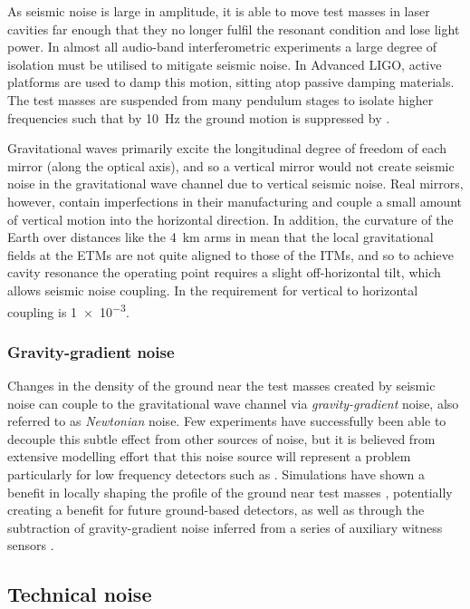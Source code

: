 As seismic noise is large in amplitude, it is able to move test masses in laser cavities far enough that they no longer fulfil the resonant condition and lose light power. In almost all audio-band interferometric experiments a large degree of isolation must be utilised to mitigate seismic noise. In Advanced \gls{LIGO}, active platforms are used to damp this motion, sitting atop passive damping materials. The test masses are suspended from many pendulum stages to isolate higher frequencies such that by \SI{10}{\hertz} the ground motion is suppressed by .

Gravitational waves primarily excite the longitudinal degree of freedom of each mirror (along the optical axis), and so a vertical mirror would not create seismic noise in the gravitational wave channel due to vertical seismic noise. Real mirrors, however, contain imperfections in their manufacturing and couple a small amount of vertical motion into the horizontal direction. In addition, the curvature of the Earth over distances like the \SI{4}{\kilo\meter} arms in \ALIGO{} mean that the local gravitational fields at the \glspl{ETM} are not quite aligned to those of the \glspl{ITM}, and so to achieve cavity resonance the operating point requires a slight off-horizontal tilt, which allows seismic noise coupling. In \ALIGO{} the requirement for vertical to horizontal coupling is \num{1e-3}.

\subsubsection{\label{sec:gravity-gradient-noise}Gravity-gradient noise}
Changes in the density of the ground near the test masses created by seismic noise can couple to the gravitational wave channel via \emph{gravity-gradient} noise, also referred to as \emph{Newtonian} noise. Few experiments have successfully been able to decouple this subtle effect from other sources of noise, but it is believed from extensive modelling effort that this noise source will represent a problem particularly for low frequency detectors such as \ETLF{} \cite{ET2011, Hild2011}. Simulations have shown a benefit in locally shaping the profile of the ground near test masses \cite{Harms2014}, potentially creating a benefit for future ground-based detectors, as well as through the subtraction of gravity-gradient noise inferred from a series of auxiliary witness sensors \cite{Harms2015}.

\subsection{Technical noise}


